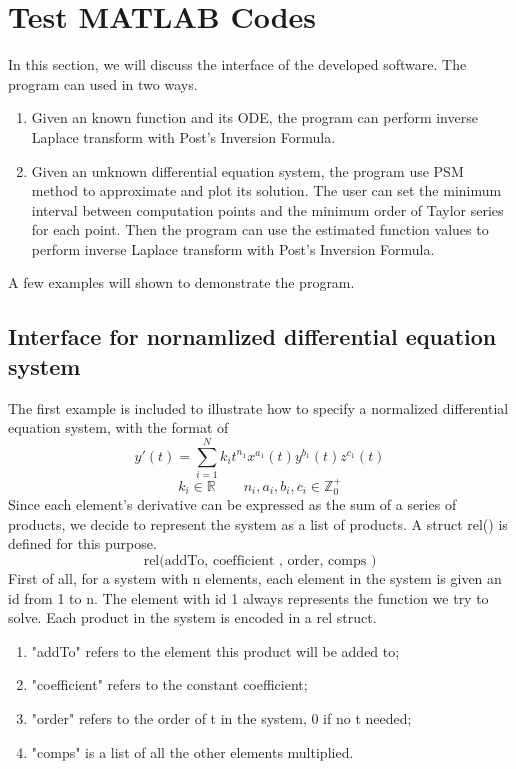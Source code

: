 \documentclass[12pt]{article}
\begin{document}
\section{Test MATLAB Codes}

In this section, we will discuss the interface of the developed software. The program can used in two ways.
\begin{enumerate}
\item Given an known function and its ODE, the program can perform inverse Laplace transform with Post's Inversion Formula.
\item Given an unknown differential equation system, the program use PSM method to approximate and plot its solution. The user can set the minimum interval between computation points and the minimum order of Taylor series for each point.
Then the program can use the estimated function values to perform inverse Laplace transform with Post's Inversion Formula.
\end{enumerate}
A few examples will shown to demonstrate the program.

\subsection{Interface for nornamlized differential equation system}

The first example is included to illustrate how to specify a normalized differential equation system, with the format of 
$$
y'(t) = \sum^N_{i=1} k_{i} t^{n_{1}} x^{a_{1}}(t) y^{b_{1}}(t) z^{c_{1}}(t) 
$$
$$
k_i \in \mathbb{R} \qquad n_i, a_i, b_i, c_i \in \mathbb{Z}^+_0
$$
Since each element's derivative can be expressed as the sum of a series of products, we decide to represent the system as a list of products. A struct rel() is defined for this purpose.
$$ \text{rel(addTo, coefficient , order, comps )}$$
First of all, for a system with n elements, each element in the system is given an id from 1 to n. The element with id 1 always represents the function we try to solve. Each product in the system is encoded in a rel struct.
\begin{enumerate}
\item "addTo" refers to the element this product will be added to;
\item "coefficient" refers to the constant coefficient;
\item "order" refers to the order of t in the system, 0 if no t needed; 
\item "comps" is a list of all the other elements multiplied.
\end{enumerate}
\end{document}
